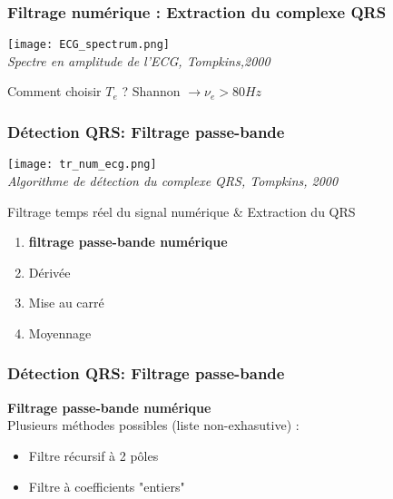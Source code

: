 \documentclass{beamer}
\begin{document}
\begin{frame}
\frametitle{Filtrage numérique :  Extraction du complexe QRS}
\begin{center}
\texttt{[image: ECG\_spectrum.png]}\\
\textit{\scriptsize Spectre en amplitude de l'ECG, Tompkins,2000}\\
\vspace{0.1cm}
\end{center}
Comment choisir $T_e$ ?  {Shannon $\rightarrow \nu_e > 80 Hz$   }


\end{frame}

\begin{frame}
\frametitle{Détection QRS: Filtrage passe-bande}
\begin{center}
\texttt{[image: tr\_num\_ecg.png]}\\
\textit{\footnotesize Algorithme de détection du complexe QRS, Tompkins, 2000}\\
\vspace{0.3cm}
\end{center}
Filtrage temps réel du signal numérique \& Extraction du QRS
\begin{enumerate}
\item \textbf{filtrage passe-bande numérique}
\item Dérivée 
\item Mise au carré 
\item Moyennage
\end{enumerate}
\end{frame}

\begin{frame}
\frametitle{Détection QRS: Filtrage passe-bande}
 \textbf{Filtrage passe-bande numérique}\\
 \vspace{0.3 cm}
 Plusieurs méthodes possibles (liste non-exhasutive) :\\
 \vspace{0.2cm}
 \begin{itemize}
 \item Filtre récursif à  2 pôles
 \vspace{0.2cm}
 \item Filtre à coefficients "entiers"
 \vspace{0.2cm}
 \end{itemize}
\end{frame}
\end{document}
